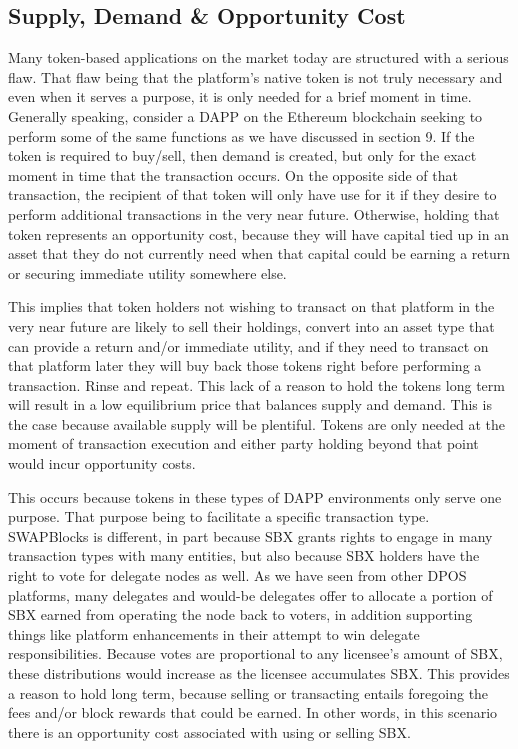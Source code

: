 \documentclass[12pt]{article}
\begin{document}
\subsection{Supply, Demand & Opportunity Cost}

Many token-based applications on the market today are structured with a serious flaw. That flaw being that 
the platform’s native token is not truly necessary and even when it serves a purpose, it is only needed for 
a brief moment in time. Generally speaking, consider a DAPP on the Ethereum blockchain seeking to perform some of 
the same functions as we have discussed in section 9. If the token is required to buy/sell, then demand is created, 
but only for the exact moment in time that the transaction occurs. On the opposite side of that transaction, the 
recipient of that token will only have use for it if they desire to perform additional transactions in the very 
near future. Otherwise, holding that token represents an opportunity cost, because they will have capital tied up 
in an asset that they do not currently need when that capital could be earning a return or securing immediate 
utility somewhere else. 

This implies that token holders not wishing to transact on that platform in the very near future are likely to 
sell their holdings, convert into an asset type that can provide a return and/or immediate utility, and if 
they need to transact on that platform later they will buy back those tokens right before performing a transaction. 
Rinse and repeat. This lack of a reason to hold the tokens long term will result in a low equilibrium price that 
balances supply and demand. This is the case because available supply will be plentiful. Tokens are only needed at 
the moment of transaction execution and either party holding beyond that point would incur opportunity costs.

This occurs because tokens in these types of DAPP environments only serve one purpose. That purpose being to facilitate 
a specific transaction type. SWAPBlocks is different, in part because SBX grants rights to engage in many transaction 
types with many entities, but also because SBX holders have the right to vote for delegate nodes as well. As we 
have seen from other DPOS platforms, many delegates and would-be delegates offer to allocate a portion of SBX earned 
from operating the node back to voters, in addition supporting things like platform enhancements in their attempt to win 
delegate responsibilities. Because votes are proportional to any licensee’s amount of SBX, these distributions would increase 
as the licensee accumulates SBX. This provides a reason to hold long term, because selling or transacting entails foregoing 
the fees and/or block rewards that could be earned. In other words, in this scenario there is an opportunity cost 
associated with using or selling SBX.
\end{document}
